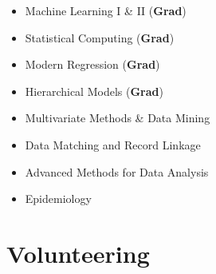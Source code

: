 \documentclass[11pt,a4paper,sans]{moderncv} %
\begin{document}
  \begin{multicols}{2}
\begin{itemize}
\item Machine Learning I \& II (\textbf{Grad})
\item 	Statistical Computing (\textbf{Grad})
\item 	Modern Regression (\textbf{Grad})
\item Hierarchical Models (\textbf{Grad})
\item 	Multivariate Methods \& Data Mining
\item 	Data Matching and Record Linkage
\item 	Advanced Methods for Data Analysis


\item 	Epidemiology


\end{itemize}


\end{multicols}

\section{Volunteering}
\end{document}
